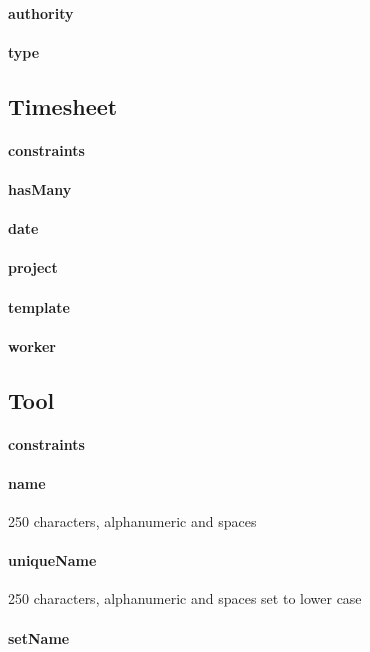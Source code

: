 \documentclass[12pt]{article}
\begin{document}
\paragraph{authority}
\paragraph{type}

\setcounter{paragraph}{0}
\subsection{Timesheet}
\paragraph{constraints}
\paragraph{hasMany}
\paragraph{date}
\paragraph{project}
\paragraph{template}
\paragraph{worker}

\setcounter{paragraph}{0}
\subsection{Tool}
\paragraph{constraints}
\paragraph{name} 250 characters, alphanumeric and spaces 
\paragraph{uniqueName} 250 characters, alphanumeric and spaces  set to lower case
\paragraph{setName}
\end{document}
